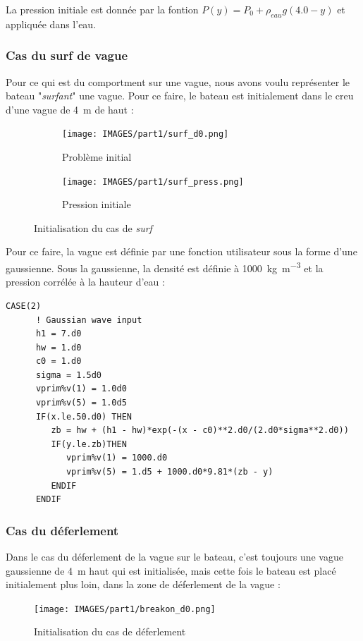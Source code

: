 \documentclass[../main.tex]{subfiles}
\begin{document}
La pression initiale est donnée par la fontion $P(y) = P_0 + \rho_{eau} g (4.0 - y)$ et appliquée dans l'eau.

\newpage
\subsubsection{Cas du surf de vague}
Pour ce qui est du comportment sur une vague, nous avons voulu représenter le bateau "\textit{surfant}" une vague. Pour ce faire, le bateau est initialement dans le creu d'une vague de \qty{4}{\meter} de haut :
\begin{figure}[H]
\centering
\begin{subfigure}[b]{11.7cm}
    \centering
    \texttt{[image: IMAGES/part1/surf\_d0.png]}
    \caption{Problème initial}
\end{subfigure}
\vfill
\begin{subfigure}[b]{11cm}
    \centering
    \texttt{[image: IMAGES/part1/surf\_press.png]}
    \caption{Pression initiale}
\end{subfigure}
\caption{Initialisation du cas de \textit{surf}}
\end{figure}

Pour ce faire, la vague est définie par une fonction utilisateur sous la forme d'une gaussienne. Sous la gaussienne, la densité est définie à \qty{1000}{\kilo\g\per\cubic\meter} et la pression corrélée à la hauteur d'eau :
\begin{lstlisting}[style=f90, caption={Fonction utilisateur pour le cas de \textit{surf}}, captionpos=b]
    CASE(2)
      ! Gaussian wave input
      h1 = 7.d0
      hw = 1.d0
      c0 = 1.d0
      sigma = 1.5d0
      vprim%v(1) = 1.0d0
      vprim%v(5) = 1.0d5
      IF(x.le.50.d0) THEN
         zb = hw + (h1 - hw)*exp(-(x - c0)**2.d0/(2.d0*sigma**2.d0))
         IF(y.le.zb)THEN
            vprim%v(1) = 1000.d0
            vprim%v(5) = 1.d5 + 1000.d0*9.81*(zb - y)
         ENDIF
      ENDIF
\end{lstlisting}

\subsubsection{Cas du déferlement}
Dans le cas du déferlement de la vague sur le bateau, c'est toujours une vague gaussienne de \qty{4}{\meter} haut qui est initialisée, mais cette fois le bateau est placé initialement plus loin, dans la zone de déferlement de la vague : 
\begin{figure}[H]
    \centering
    \texttt{[image: IMAGES/part1/breakon\_d0.png]}
    \caption{Initialisation du cas de déferlement}
\end{figure}
\end{document}
